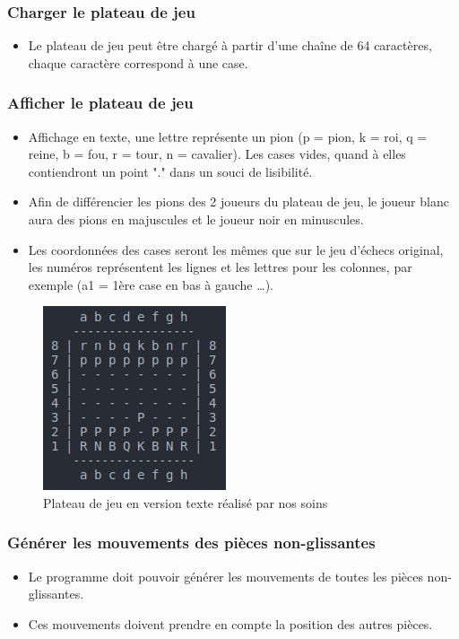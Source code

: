 \huge\documentclass{article}
\begin{document}
\subsubsection{Charger le plateau de jeu}
\begin{itemize}
    \item Le plateau de jeu peut être chargé à partir d'une chaîne de 64 caractères, chaque caractère correspond à une case.
\end{itemize}
\medskip
\medskip
\subsubsection{Afficher le plateau de jeu}
\medskip
\begin{itemize}
    \item Affichage en texte, une lettre représente un pion (p = pion, k = roi, q = reine,
    b = fou, r = tour, n = cavalier).
    Les cases vides, quand à elles contiendront un point "." dans un souci de lisibilité.
    \item Afin de différencier les pions des 2 joueurs du plateau de jeu, le joueur blanc aura des pions en majuscules et le joueur noir en minuscules.
    \item Les coordonnées des cases seront les mêmes que sur le jeu d'échecs original, les numéros représentent les lignes et les lettres pour les colonnes, par exemple (a1 = 1ère case en bas à gauche \dots).
\end{itemize}
\begin{figure}[h]
\centering
\includegraphics[scale = 0.5]{img/pdp_chess_board.png}
\caption{Plateau de jeu en version texte réalisé par nos soins}
\end{figure}
\medskip
\subsubsection{Générer les mouvements des pièces non-glissantes}
\begin{itemize}
    \item Le programme doit pouvoir générer les mouvements de toutes les pièces non-glissantes.
    \item Ces mouvements doivent prendre en compte la position des autres pièces.
\end{itemize}
\medskip
\end{document}
